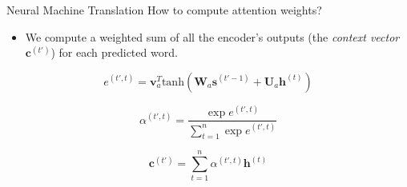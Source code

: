 \documentclass[aspectratio=169]{beamer}
\begin{document}
\begin{frame}{Neural Machine Translation}
\centering
How to compute attention weights?

\raggedright
\begin{itemize}
	\item We compute a weighted sum of all the encoder's outputs (the \textit{context vector} $\mathbf{c}^{(t')}$) for each predicted word.
\end{itemize}
\vspace{.5cm}
$$
e^{(t', t)} = \mathbf{v}_a ^T \mathrm{tanh} \left( \mathbf{W}_a \mathbf{s}^{(t'-1)} + \mathbf{U}_a \mathbf{h}^{(t)} \right)
$$

$$
\alpha^{(t', t)} = \frac{\exp e^{(t', t)}}{\sum_{t=1}^{n} \exp e^{(t', t)}}
$$

$$
\mathbf{c}^{(t')} = \sum_{t=1} ^{n} \alpha^{(t', t)} \mathbf{h}^{(t)}
$$

\end{frame}
\end{document}
